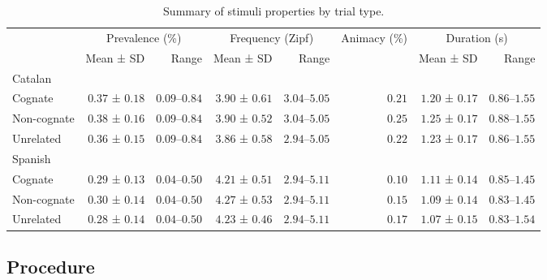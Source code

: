 \documentclass[
  letterpaper,
  DIV=11,
  numbers=noendperiod]{scrartcl}
\begin{document}
\hypertarget{tbl-stimuli}{}
\begin{longtable}{lrrrrrrr}
\caption{\label{tbl-stimuli}Summary of stimuli properties by trial type. }\tabularnewline

\toprule
 & \multicolumn{2}{c}{Prevalence (\%)} & \multicolumn{2}{c}{Frequency (Zipf)} & Animacy (\%) & \multicolumn{2}{c}{Duration (s)} \\ 
\cmidrule(lr){2-3} \cmidrule(lr){4-5} \cmidrule(lr){6-6} \cmidrule(lr){7-8}
 & Mean ± SD & Range & Mean ± SD & Range &  & Mean ± SD & Range \\ 
\midrule
\multicolumn{8}{l}{Catalan} \\ 
\midrule
Cognate & $0.37$ ± $0.18$ & $0.09$–$0.84$ & $3.90$ ± $0.61$ & $3.04$–$5.05$ & $0.21$ & $1.20$ ± $0.17$ & $0.86$–$1.55$ \\ 
Non-cognate & $0.38$ ± $0.16$ & $0.09$–$0.84$ & $3.90$ ± $0.52$ & $3.04$–$5.05$ & $0.25$ & $1.25$ ± $0.17$ & $0.88$–$1.55$ \\ 
Unrelated & $0.36$ ± $0.15$ & $0.09$–$0.84$ & $3.86$ ± $0.58$ & $2.94$–$5.05$ & $0.22$ & $1.23$ ± $0.17$ & $0.86$–$1.55$ \\ 
\midrule
\multicolumn{8}{l}{Spanish} \\ 
\midrule
Cognate & $0.29$ ± $0.13$ & $0.04$–$0.50$ & $4.21$ ± $0.51$ & $2.94$–$5.11$ & $0.10$ & $1.11$ ± $0.14$ & $0.85$–$1.45$ \\ 
Non-cognate & $0.30$ ± $0.14$ & $0.04$–$0.50$ & $4.27$ ± $0.53$ & $2.94$–$5.11$ & $0.15$ & $1.09$ ± $0.14$ & $0.83$–$1.45$ \\ 
Unrelated & $0.28$ ± $0.14$ & $0.04$–$0.50$ & $4.23$ ± $0.46$ & $2.94$–$5.11$ & $0.17$ & $1.07$ ± $0.15$ & $0.83$–$1.54$ \\ 
\bottomrule
\end{longtable}

\hypertarget{procedure}{%
\subsection{Procedure}\label{procedure}}
\end{document}
